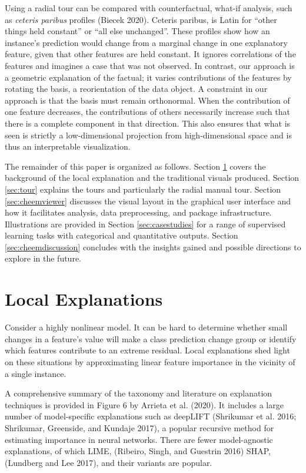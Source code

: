 \documentclass[11pt,twoside]{article}
\begin{document}
Using a radial tour can be compared with counterfactual, what-if analysis, such as \emph{ceteris paribus} profiles (Biecek 2020). Ceteris paribus, is Latin for ``other things held constant'' or ``all else unchanged''. These profiles show how an instance's prediction would change from a marginal change in one explanatory feature, given that other features are held constant. It ignores correlations of the features and imagines a case that was not observed. In contrast, our approach is a geometric explanation of the factual; it varies contributions of the features by rotating the basis, a reorientation of the data object. A constraint in our approach is that the basis must remain orthonormal. When the contribution of one feature decreases, the contributions of others necessarily increase such that there is a complete component in that direction. This also ensures that what is seen is strictly a low-dimensional projection from high-dimensional space and is thus an interpretable visualization.

The remainder of this paper is organized as follows. Section \ref{sec:explanations} covers the background of the local explanation and the traditional visuals produced. Section \ref{sec:tour} explains the tours and particularly the radial manual tour. Section \ref{sec:cheemviewer} discusses the visual layout in the graphical user interface and how it facilitates analysis, data preprocessing, and package infrastructure. Illustrations are provided in Section \ref{sec:casestudies} for a range of supervised learning tasks with categorical and quantitative outputs. Section \ref{sec:cheemdiscussion} concludes with the insights gained and possible directions to explore in the future.

\hypertarget{sec:explanations}{%
\section{Local Explanations}\label{sec:explanations}}

Consider a highly nonlinear model. It can be hard to determine whether small changes in a feature's value will make a class prediction change group or identify which features contribute to an extreme residual. Local explanations shed light on these situations by approximating linear feature importance in the vicinity of a single instance.

A comprehensive summary of the taxonomy and literature on explanation techniques is provided in Figure 6 by Arrieta et al. (2020). It includes a large number of model-specific explanations such as deepLIFT (Shrikumar et al. 2016; Shrikumar, Greenside, and Kundaje 2017), a popular recursive method for estimating importance in neural networks. There are fewer model-agnostic explanations, of which LIME, (Ribeiro, Singh, and Guestrin 2016) SHAP, (Lundberg and Lee 2017), and their variants are popular.
\end{document}

